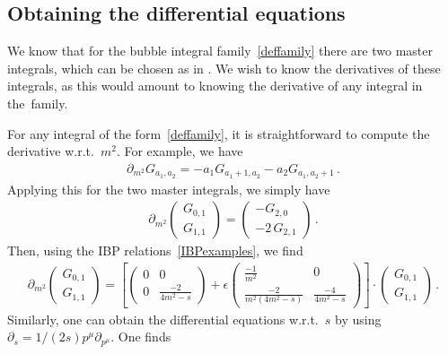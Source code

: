   \subsection{Obtaining the differential equations}
  \label{subsec:obtainingDE}
We know that for the bubble integral family~\eqref{deffamily} there are two master integrals, which can be chosen as in .
We wish to know the derivatives of these integrals, as this would amount to knowing the derivative of any integral in the~family.

For any integral of the form~\eqref{deffamily}, it is straightforward to compute the derivative w.r.t.~$m^2$.
For example, we have
\begin{align}
\partial_{m^2} G_{a_1,a_2} = -a_1 G_{a_1 + 1,a_2} - a_2 G_{a_1, a_2 + 1 } \,.
\end{align}
Applying this for the two master integrals, we simply have
\begin{align}
\partial_{m^2} \begin{pmatrix}
G_{0,1}\\
G_{1,1} 
\end{pmatrix}
=
\begin{pmatrix}
-G_{2,0}\\
-2 \, G_{2,1} 
\end{pmatrix}\,.
\end{align}
Then, using the IBP relations~\eqref{IBPexamples}, we find
\begin{align}\label{DEexample1}
\partial_{m^2} \begin{pmatrix}
G_{0,1} \\
G_{1,1}
\end{pmatrix}
=
\left[
\begin{pmatrix}
0 & 0 \\
0 & \frac{-2}{4 m^2-s} 
\end{pmatrix}
+
\epsilon
\begin{pmatrix}
\frac{-1}{m^2} & 0 \\
\frac{-2}{m^2(4m^2-s)} & \frac{-4}{4 m^2-s} 
\end{pmatrix}
\right] \cdot
\begin{pmatrix}
G_{0,1} \\
G_{1,1}
\end{pmatrix}
\,.
\end{align}
Similarly, one can obtain the differential equations w.r.t.~$s$ by using $ \partial_s = 1/(2 s) p^{\mu} \partial_{p^{\mu}}$.
One finds
